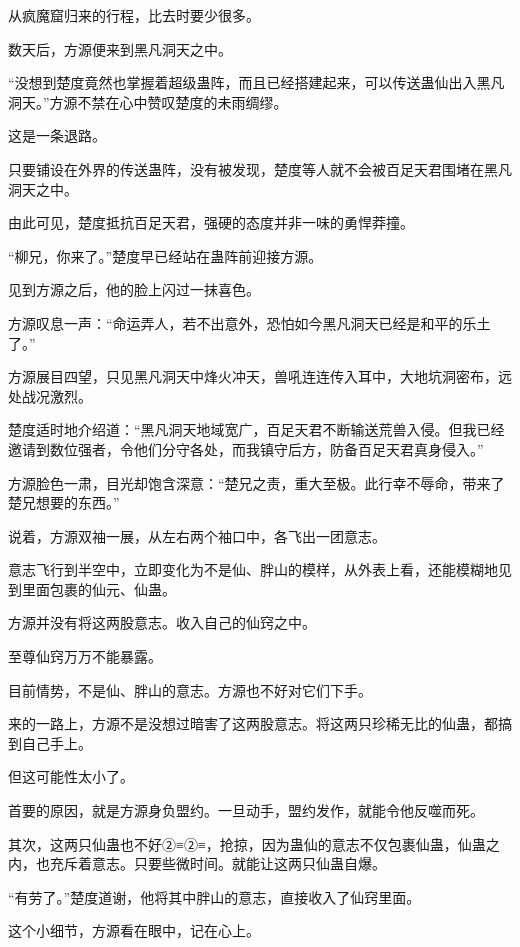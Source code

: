 
\begin{this_body}

从疯魔窟归来的行程，比去时要少很多。

数天后，方源便来到黑凡洞天之中。

“没想到楚度竟然也掌握着超级蛊阵，而且已经搭建起来，可以传送蛊仙出入黑凡洞天。”方源不禁在心中赞叹楚度的未雨绸缪。

这是一条退路。

只要铺设在外界的传送蛊阵，没有被发现，楚度等人就不会被百足天君围堵在黑凡洞天之中。

由此可见，楚度抵抗百足天君，强硬的态度并非一味的勇悍莽撞。

“柳兄，你来了。”楚度早已经站在蛊阵前迎接方源。

见到方源之后，他的脸上闪过一抹喜色。

方源叹息一声：“命运弄人，若不出意外，恐怕如今黑凡洞天已经是和平的乐土了。”

方源展目四望，只见黑凡洞天中烽火冲天，兽吼连连传入耳中，大地坑洞密布，远处战况激烈。

楚度适时地介绍道：“黑凡洞天地域宽广，百足天君不断输送荒兽入侵。但我已经邀请到数位强者，令他们分守各处，而我镇守后方，防备百足天君真身侵入。”

方源脸色一肃，目光却饱含深意：“楚兄之责，重大至极。此行幸不辱命，带来了楚兄想要的东西。”

说着，方源双袖一展，从左右两个袖口中，各飞出一团意志。

意志飞行到半空中，立即变化为不是仙、胖山的模样，从外表上看，还能模糊地见到里面包裹的仙元、仙蛊。

方源并没有将这两股意志。收入自己的仙窍之中。

至尊仙窍万万不能暴露。

目前情势，不是仙、胖山的意志。方源也不好对它们下手。

来的一路上，方源不是没想过暗害了这两股意志。将这两只珍稀无比的仙蛊，都搞到自己手上。

但这可能性太小了。

首要的原因，就是方源身负盟约。一旦动手，盟约发作，就能令他反噬而死。

其次，这两只仙蛊也不好②≡②≡，抢掠，因为蛊仙的意志不仅包裹仙蛊，仙蛊之内，也充斥着意志。只要些微时间。就能让这两只仙蛊自爆。

“有劳了。”楚度道谢，他将其中胖山的意志，直接收入了仙窍里面。

这个小细节，方源看在眼中，记在心上。


\end{this_body}
